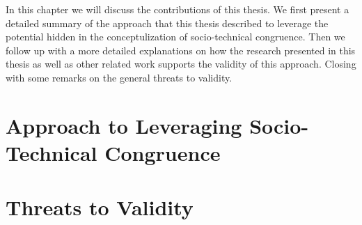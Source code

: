 In this chapter we will discuss the contributions of this thesis.
We first present a detailed summary of the approach that this thesis described to leverage the potential hidden in the conceptulization of socio-technical congruence.
Then we follow up with a more detailed explanations on how the research presented in this thesis as well as other related work supports the validity of this approach.
Closing with some remarks on the general threats to validity.
\section{Approach to Leveraging Socio-Technical Congruence}
\section{}
\section{Threats to Validity}
